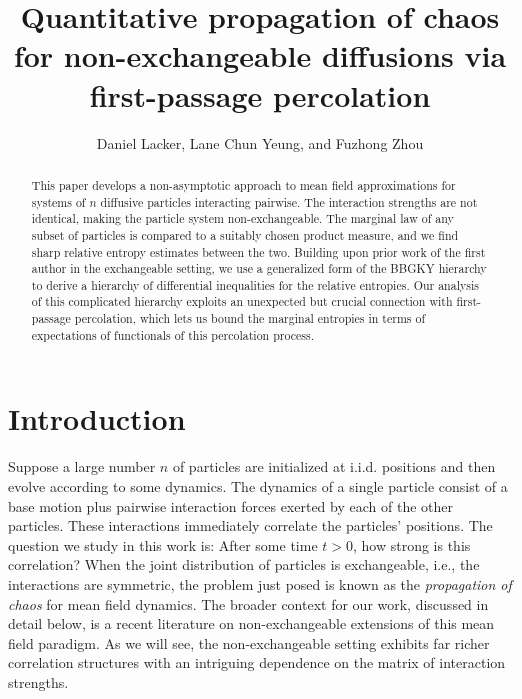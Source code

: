 \documentclass[11pt,reqno]{amsart}
\title[Quantitative non-exchangeable propagation of chaos]{Quantitative propagation of chaos for non-exchangeable diffusions via first-passage percolation}
\author{Daniel Lacker, Lane Chun Yeung, and Fuzhong Zhou}
\numberwithin{equation}{section}
\theoremstyle{definition}
\begin{document}
\begin{abstract}
This paper develops a non-asymptotic approach to mean field approximations for systems of $n$ diffusive particles interacting pairwise. The interaction strengths are not identical, making the particle system non-exchangeable. The marginal law of any subset of particles is compared to a suitably chosen product measure, and we find sharp relative entropy estimates between the two.
Building upon prior work of the first author in the exchangeable setting, we use  a generalized form of the BBGKY hierarchy to derive a hierarchy of differential inequalities for the relative entropies.
Our analysis of this complicated hierarchy exploits an unexpected but crucial connection with first-passage percolation, which lets us bound the marginal entropies in terms of expectations of functionals of this percolation process.
\end{abstract}

\maketitle



\section{Introduction}



Suppose a large number $n$ of particles are initialized at i.i.d. positions and then evolve according to some dynamics. The dynamics of a single particle consist of a base motion plus pairwise interaction forces exerted by each of the other particles. These interactions immediately correlate the particles' positions. The question we study in this work is: After some time $t > 0$, how strong is this correlation? 
When the joint distribution of particles is exchangeable, i.e., the interactions are symmetric, the problem just posed is known as the \emph{propagation of chaos} for mean field dynamics. The broader context for our work, discussed in detail below, is a recent literature on non-exchangeable extensions of this mean field paradigm. As we will see, the non-exchangeable setting exhibits far richer correlation structures with an intriguing dependence on the matrix of interaction strengths.
\end{document}
